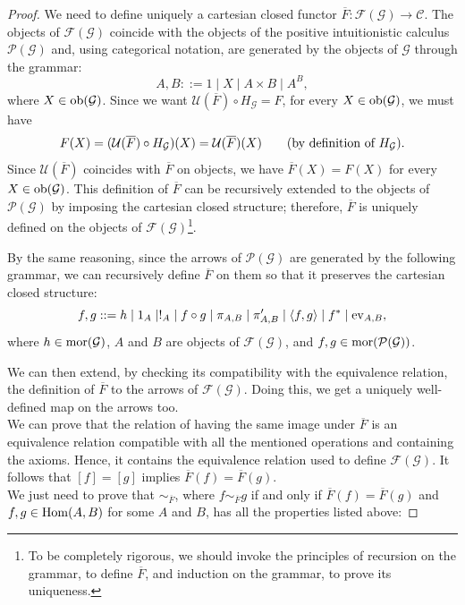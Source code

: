 \begin{proof}
    We need to define uniquely a cartesian closed functor $\overline F : \mathcal F(\mathcal G) \to \mathcal C$. The objects of $\mathcal F(\mathcal G)$ coincide with the objects of the positive intuitionistic calculus $\mathcal P(\mathcal G)$ and, using categorical notation, are generated by the objects of $\mathcal G$ through the grammar:
    \[ A,B ::= 1 \mid X \mid A \times B \mid A^B, \]
    where $X \in \operatorname{ob}(\mathcal G)$. Since we want $\mathcal U(\overline F) \circ H_\mathcal G = F$, for every $X \in \operatorname{ob}(\mathcal G)$, we must have
    \[ F(X) = (\mathcal U(\overline F)\circ H_\mathcal G)(X) = \mathcal U(\overline F)(X)  \qquad (\textnormal{by definition of $H_{\mathcal G}$}).\]
    Since $\mathcal U(\overline F)$ coincides with $\overline F$ on objects, we have $\overline F(X) = F(X)$ for every $X \in \operatorname{ob}(\mathcal G)$.
    This definition of $\overline F$ can be recursively extended to the objects of $\mathcal P(\mathcal G)$ by imposing the cartesian closed structure; therefore, $\overline F$ is uniquely defined on the objects of $\mathcal F(\mathcal G)$\footnote{To be completely rigorous, we should invoke the principles of recursion on the grammar, to define $\overline F$, and induction on the grammar, to prove its uniqueness.}.\par
    By the same reasoning, since the arrows of $\mathcal P(\mathcal G)$ are generated by the following grammar, we can recursively define $\overline F$ on them so that it preserves the cartesian closed structure:
    \[ f,g ::= h \mid 1_A \mid !_A \mid f \circ g \mid \pi_{A,B} \mid \pi_{A,B}' \mid \langle f, g \rangle \mid f^* \mid \operatorname{ev}_{A,B},\]
    where $h \in \operatorname{mor}(\mathcal G)$, $A$ and $B$ are objects of $\mathcal F(\mathcal G)$, and $f, g \in \operatorname{mor}(\mathcal P(\mathcal G))$.\par
    We can then extend, by checking its compatibility with the equivalence relation, the definition of $\overline F$ to the arrows of $\mathcal F(\mathcal G)$. Doing this, we get a uniquely well-defined map on the arrows too.\\
    We can prove that the relation of having the same image under $\overline F$ is an equivalence relation compatible with all the mentioned operations and containing the axioms. Hence, it contains the equivalence relation used to define $\mathcal F(\mathcal G)$. It follows that $[f] = [g]$ implies $\overline F(f) = \overline F(g)$.\\
    We just need to prove that $\sim_{\overline F}$, where $f \sim_{\overline F} g$ if and only if $\overline F(f) = \overline F(g)$ and $f,g \in \operatorname{Hom}(A,B)$ for some $A$ and $B$, has all the properties listed above:

\end{proof}
